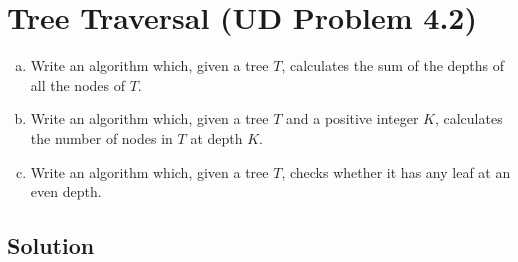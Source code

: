 
\section{Tree Traversal (UD Problem 4.2)}

\begin{enumerate}[(a)]
  \item Write an algorithm which, given a tree $T$,
    calculates the sum of the depths of all the nodes of $T$.
  \item Write an algorithm which, given a tree $T$ and a positive integer $K$,
    calculates the number of nodes in $T$ at depth $K$.
  \item Write an algorithm which, given a tree $T$,
    checks whether it has any leaf at an even depth.
\end{enumerate}

\subsection{Solution}



